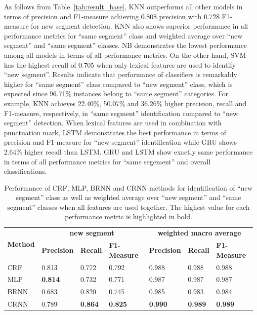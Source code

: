 \documentclass{amia}
\begin{document}
As follows from Table~\ref{tab:result_base}, KNN outperforms all other models in terms of precision and F1-measure achieving 0.808 precision with 0.728 F1-measure for new segment detection. KNN also shows superior performance in all performance metrics for ``same segment'' class and weighted average over ``new segment'' and ``same segment'' classes. NB demonstrates the lowest performance among all models in terms of all performance metrics. On the other hand, SVM has the highest recall of 0.705 when only lexical features are used to identify ``new segment''. Results indicate that performance of classifiers is remarkably higher for ``same segment'' class compared to ``new segment'' class, which is expected since 96.71\% instances belong to ``same segment'' categories. For example, KNN achieves 22.40\%, 50.07\% and 36.26\% higher precision, recall and F1-measure, respectively, in ``same segment'' identification compared to ``new segment'' detection. When lexical features are used in combination with punctuation mark, LSTM demonstrates the best performance in terms of precision and F1-measure for ``new segment'' identification while GRU shows 2.64\% higher recall than LSTM. GRU and LSTM show exactly same performance in terms of all performance metrics for ``same segement'' and overall classifications. \\  

\begin{table}[ht]
\centering
\caption{Performance of CRF, MLP, BRNN and CRNN methods for identification of ``new segment'' class as well as weighted average over ``new segment'' and ``same segment'' classes when all features are used together. The highest value for each performance metric
is highlighted in bold.}
\label{tab:result_weighted_avg}
 \begin{tabular}{|l|l|l|l|l|l|l|}
  \hline
   \multirow{2}{*}{\textbf{Method}} & \multicolumn{3}{|c|}{\textbf{new segment}} & \multicolumn{3}{|c|}{\textbf{weighted macro average}} \\\cline{2-7}
   & \textbf{Precision}  & \textbf{Recall} & \textbf{F1-Measure} & \textbf{Precision}  & \textbf{Recall} & \textbf{F1-Measure} \\ \hline    
 CRF & 0.813 & 0.772 & 0.792 & 0.988 & 0.988 & 0.988 \\ \hline
 MLP & \textbf{0.814} & 0.732 & 0.771 & 0.987 & 0.987 & 0.987 \\ \hline
 BRNN & 0.683 & 0.820 & 0.745 & 0.985 & 0.983 & 0.984 \\ \hline
 CRNN & 0.789 & \textbf{0.864} & \textbf{0.825} & \textbf{0.990} & \textbf{0.989} & \textbf{0.989} \\ \hline
  \end{tabular}
\end{table}              
\end{document}
